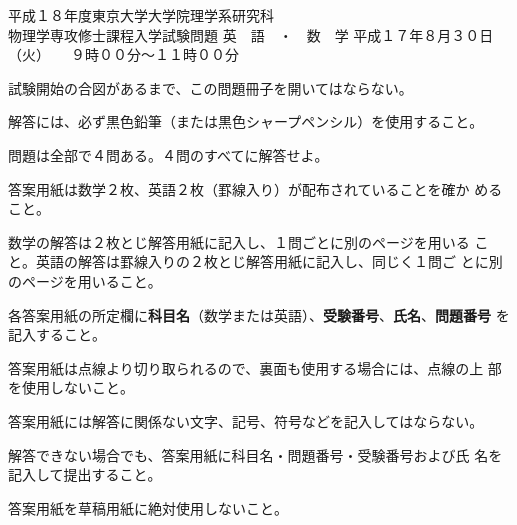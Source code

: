 \begin{inshicover}%
  {平成１８年度東京大学大学院理学系研究科\\物理学専攻修士課程入学試験問題}%
  {英　語　・　数　学}%
  {平成１７年８月３０日（火）　　９時００分〜１１時００分}
\item 試験開始の合図があるまで、この問題冊子を開いてはならない。
\item 解答には、必ず黒色鉛筆（または黒色シャープペンシル）を使用すること。
\item 問題は全部で４問ある。４問のすべてに解答せよ。
\item 答案用紙は数学２枚、英語２枚（罫線入り）が配布されていることを確か
      めること。
\item 数学の解答は２枚とじ解答用紙に記入し、１問ごとに別のページを用いる
      こと。英語の解答は罫線入りの２枚とじ解答用紙に記入し、同じく１問ご
      とに別のページを用いること。
\item 各答案用紙の所定欄に{\bf 科目名}（数学または英語）、{\bf 受験番号}、{\bf 氏名}、{\bf 問題番号}
      を記入すること。
\item 答案用紙は点線より切り取られるので、裏面も使用する場合には、点線の上
      部を使用しないこと。
\item 答案用紙には解答に関係ない文字、記号、符号などを記入してはならない。
\item 解答できない場合でも、答案用紙に科目名・問題番号・受験番号および氏
      名を記入して提出すること。
\item 答案用紙を草稿用紙に絶対使用しないこと。
\end{inshicover}
